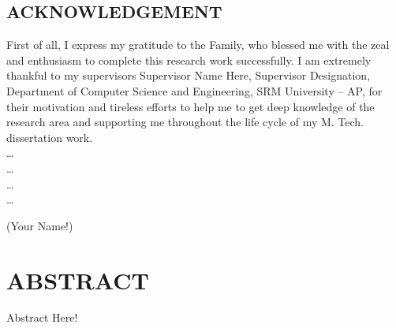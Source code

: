 \documentclass[12pt,a4paper]{report}
\begin{document}
\clearpage

\begin{center}
	\section*{ACKNOWLEDGEMENT}
	\noindent{\rule{\textwidth}{1.5pt}}
\end{center}
First of all, I express my gratitude to the Family, who blessed me with the zeal and enthusiasm to complete this research work successfully. I am extremely thankful to my supervisors Supervisor Name Here, Supervisor Designation, Department of Computer Science and Engineering, SRM University -- AP, for their motivation and tireless efforts to help me to get deep knowledge of the research area and supporting me throughout the life cycle of my M. Tech. dissertation work.  
\\
\dots \\
\dots \\
\dots \\
\dots


\begin{flushright}
	(Your Name!)
\end{flushright}
\clearpage
\section*{ABSTRACT}
\noindent{\rule{\textwidth}{1.5pt}}
Abstract Here!
\clearpage

\tableofcontents
\listoffigures
{}

\listoftables
{}

\listofalgorithms
{}
\end{document}
